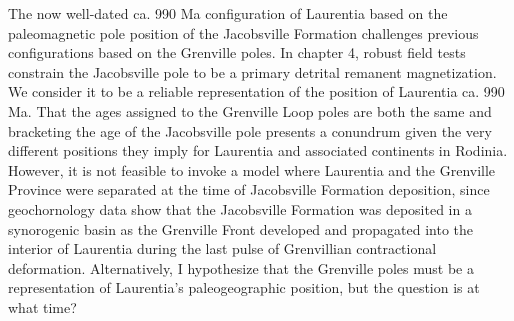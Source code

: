 The now well-dated ca. 990 Ma configuration of Laurentia based on the paleomagnetic pole position of the Jacobsville Formation challenges previous configurations based on the Grenville poles. In chapter 4, robust field tests constrain the Jacobsville pole to be a primary detrital remanent magnetization. We consider it to be a reliable representation of the position of Laurentia ca. 990 Ma. That the ages assigned to the Grenville Loop poles are both the same and bracketing the age of the Jacobsville pole presents a conundrum given the very different positions they imply for Laurentia and associated continents in Rodinia. However, it is not feasible to invoke a model where Laurentia and the Grenville Province were separated at the time of Jacobsville Formation deposition, since geochornology data show that the Jacobsville Formation was deposited in a synorogenic basin as the Grenville Front developed and propagated into the interior of Laurentia during the last pulse of Grenvillian contractional deformation. Alternatively, I hypothesize that the Grenville poles must be a representation of Laurentia's paleogeographic position, but the question is at what time? 


